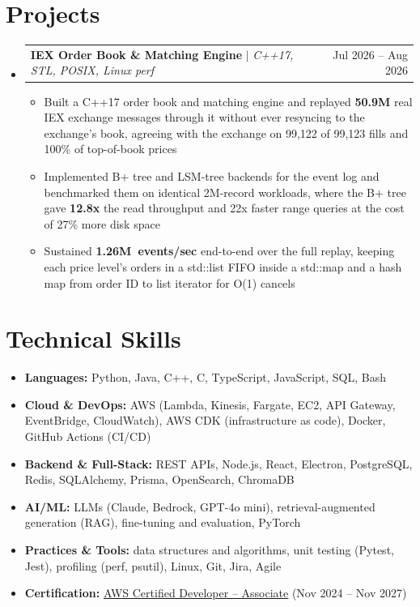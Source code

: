 \documentclass[letterpaper,10pt]{article}
\makeatletter
\newcommand{\resumeItem}[1]{\item{#1}\vspace{-1pt}}
\newcommand{\resumeProjectHeading}[2]{%
  \item
  \begin{tabular*}{\textwidth}{l@{\extracolsep{\fill}}r}
    #1 & #2 \\
  \end{tabular*}\vspace{-6pt}%
}
\newcommand{\resumeSubHeadingListStart}{\begin{itemize}[leftmargin=0in, label={}, itemsep=0pt, topsep=2pt]}
\newcommand{\resumeSubHeadingListEnd}{\end{itemize}}
\newcommand{\resumeItemListStart}{\begin{itemize}[leftmargin=0.18in, itemsep=0pt, topsep=1pt, parsep=0pt]}
\newcommand{\resumeItemListEnd}{\end{itemize}\vspace{0pt}}
\makeatother
\begin{document}
\section{Projects}
\resumeSubHeadingListStart
  \resumeProjectHeading
    {\textbf{IEX Order Book \& Matching Engine} $|$ \textit{C++17, STL, POSIX, Linux perf}}{Jul 2026 -- Aug 2026}
  \resumeItemListStart
    \resumeItem{Built a C++17 order book and matching engine and replayed \textbf{50.9M} real IEX exchange messages through it without ever resyncing to the exchange's book, agreeing with the exchange on 99,122 of 99,123 fills and 100\% of top-of-book prices}
    \resumeItem{Implemented B+ tree and LSM-tree backends for the event log and benchmarked them on identical 2M-record workloads, where the B+ tree gave \textbf{12.8x} the read throughput and 22x faster range queries at the cost of 27\% more disk space}
    \resumeItem{Sustained \mbox{\textbf{1.26M events/sec}} end-to-end over the full replay, keeping each price level's orders in a std::list FIFO inside a std::map and a hash map from order ID to list iterator for O(1) cancels}
  \resumeItemListEnd
\resumeSubHeadingListEnd

\section{Technical Skills}
\begin{itemize}[leftmargin=0in, label={}, itemsep=0pt, topsep=2pt]
  \small
  \item{\textbf{Languages:} Python, Java, C++, C, TypeScript, JavaScript, SQL, Bash}
  \item{\textbf{Cloud \& DevOps:} AWS (Lambda, Kinesis, Fargate, EC2, API Gateway, EventBridge, CloudWatch), AWS CDK (infrastructure as code), Docker, GitHub Actions (CI/CD)}
  \item{\textbf{Backend \& Full-Stack:} REST APIs, Node.js, React, Electron, PostgreSQL, Redis, SQLAlchemy, Prisma, OpenSearch, ChromaDB}
  \item{\textbf{AI/ML:} LLMs (Claude, Bedrock, GPT-4o mini), retrieval-augmented generation (RAG), fine-tuning and evaluation, PyTorch}
  \item{\textbf{Practices \& Tools:} data structures and algorithms, unit testing (Pytest, Jest), profiling (perf, psutil), Linux, Git, Jira, Agile}
  \item{\textbf{Certification:} \href{https://www.credly.com/badges/d2406a97-d937-47de-823b-724981159d3b/public_url}{\underline{AWS Certified Developer -- Associate}} (Nov 2024 -- Nov 2027)}
\end{itemize}
\end{document}
